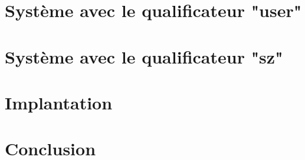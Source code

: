 \documentclass[a4paper,11pt]{memoir}
\begin{document}


\chapter{Système avec le qualificateur "user"}



\chapter{Système avec le qualificateur "sz"}



\chapter{Implantation}

\label{cha:implem}


\chapter{Conclusion}



\backmatter


\listoffigures




\end{document}
